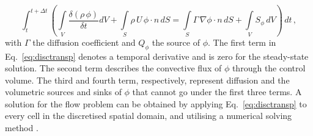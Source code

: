 \begin{equation}
\int_t^{t+\Delta t} \left( \int\limits_V \frac{\delta(\rho\, \phi)}{\delta t} dV + \int\limits_S \rho\, U \, \phi \cdot n \, dS = \int\limits_S \Gamma \, \nabla \phi \cdot n \, dS + \int\limits_V S_\phi \, dV \right)\, dt\, ,
\label{eq:disctransp}
\end{equation}
with $\Gamma$ the diffusion coefficient and $Q_\phi$ the source of $\phi$.
The first term in Eq.\ \eqref{eq:disctransp} denotes a temporal derivative and is zero for the steady-state solution. The second term describes the convective flux of $\phi$ through the control volume. The third and fourth term, respectively, represent diffusion and the volumetric sources and sinks of $\phi$ that cannot go under the first three terms. A solution for the flow problem can be obtained by applying Eq.\ \eqref{eq:disctransp} to every cell in the discretised spatial domain, and utilising a numerical solving method \citep{boekMS}.


\clearpage
\clearpage{\pagestyle{empty}\cleardoublepage}
